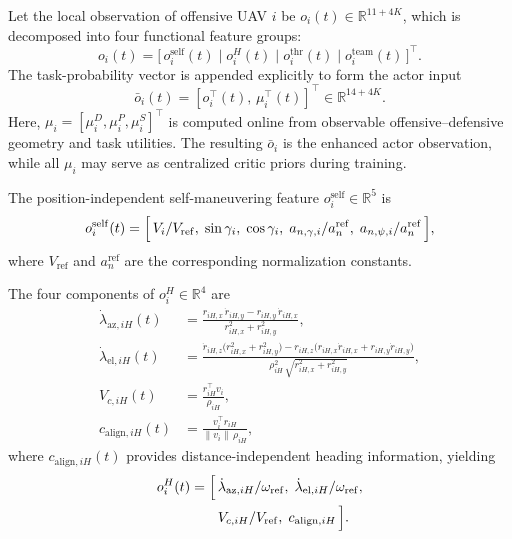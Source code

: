 \documentclass{cja}
\begin{document}
Let the local observation of offensive UAV $i$ be $o_i(t)\in\mathbb{R}^{11+4K}$, which is decomposed into four functional feature groups:
\begin{equation}
o_i(t)=\bigl[\,o_i^{\mathrm{self}}(t)\;\big|\;o_i^{H}(t)\;\big|\;o_i^{\mathrm{thr}}(t)\;\big|\;o_i^{\mathrm{team}}(t)\,\bigr]^{\top}.
\label{eq:obs-decomp}
\end{equation}
The task-probability vector is appended explicitly to form the actor input
\begin{equation}
\bar o_i(t)
=
\left[o_i^{\top}(t),\,\mu_i^{\top}(t)\right]^{\top}
\in\mathbb R^{14+4K}.
\end{equation}
Here, $\mu_i=[\mu_i^D,\mu_i^P,\mu_i^S]^{\top}$ is computed online from observable offensive--defensive geometry and task utilities. The resulting $\bar o_i$ is the enhanced actor observation, while all $\mu_i$ may serve as centralized critic priors during training.

The position-independent self-maneuvering feature $o_i^{\mathrm{self}}\in\mathbb{R}^{5}$ is
\begin{equation}
o_i^{\mathrm{self}}(t)=\Bigl[\,V_i/V_{\mathrm{ref}},\;\sin\gamma_i,\;\cos\gamma_i,\;a_{n,\gamma,i}/a^{\mathrm{ref}}_n,\;a_{n,\psi,i}/a^{\mathrm{ref}}_n\,\Bigr],
\label{eq:obs-self}
\end{equation}
where $V_{\mathrm{ref}}$ and $a^{\mathrm{ref}}_n$ are the corresponding normalization constants.

The four components of $o_i^{H}\in\mathbb{R}^{4}$ are
\begin{align}
\dot\lambda_{\mathrm{az},iH}(t)&=\frac{r_{iH,x}\,\dot r_{iH,y}-r_{iH,y}\,\dot r_{iH,x}}{r_{iH,x}^{2}+r_{iH,y}^{2}},
\label{eq:los-az}\\
\dot\lambda_{\mathrm{el},iH}(t)&=\frac{\dot r_{iH,z}\bigl(r_{iH,x}^{2}+r_{iH,y}^{2}\bigr)
-r_{iH,z}\bigl(r_{iH,x}\dot r_{iH,x}+r_{iH,y}\dot r_{iH,y}\bigr)}{\rho_{iH}^{2}\,\sqrt{r_{iH,x}^{2}+r_{iH,y}^{2}}},
\label{eq:los-el}\\
V_{c,iH}(t)&=\frac{r_{iH}^{\top}v_i}{\rho_{iH}},
\label{eq:vc-h}\\
c_{\mathrm{align},iH}(t)&=\frac{v_i^{\top}r_{iH}}{\|v_i\|\,\rho_{iH}},
\label{eq:cos-align}
\end{align}
where $c_{\mathrm{align},iH}(t)$ provides distance-independent heading information, yielding
\begin{equation}
\begin{aligned}
o_i^{H}(t)=\Bigl[\,&\dot\lambda_{\mathrm{az},iH}/\omega_{\mathrm{ref}},\;
\dot\lambda_{\mathrm{el},iH}/\omega_{\mathrm{ref}},\\
&V_{c,iH}/V_{\mathrm{ref}},\;c_{\mathrm{align},iH}\,\Bigr].
\end{aligned}
\end{equation}
\end{document}
